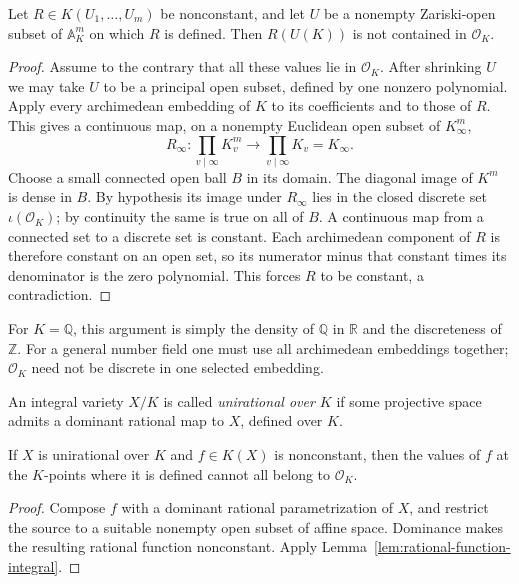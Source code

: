 \begin{lemma}\label{lem:rational-function-integral}
Let $R\in K(U_1,\ldots,U_m)$ be nonconstant, and let $U$ be a nonempty
Zariski-open subset of $\mathbb A^m_K$ on which $R$ is defined.
Then $R(U(K))$ is not contained in $\mathcal O_K$.
\end{lemma}
\begin{proof}
Assume to the contrary that all these values lie in $\mathcal O_K$.
After shrinking $U$ we may take $U$ to be a principal open subset, defined by
one nonzero polynomial.  Apply every archimedean embedding of $K$ to its
coefficients and to those of $R$.  This gives a continuous map, on a nonempty
Euclidean open subset of $K_{\infty}^{m}$,
\[
 R_{\infty}:\prod_{v\mid\infty}K_v^m
       \longrightarrow\prod_{v\mid\infty}K_v=K_{\infty}.
\]
Choose a small connected open ball $B$ in its domain.  The diagonal image of
$K^m$ is dense in $B$.  By hypothesis its image under $R_{\infty}$ lies in
the closed discrete set $\iota(\mathcal O_K)$; by continuity the same is true
on all of $B$.  A continuous map from a connected set to a discrete set is
constant.  Each archimedean component of $R$ is therefore constant on an
open set, so its numerator minus that constant times its denominator is the
zero polynomial.  This forces $R$ to be constant, a contradiction.
\end{proof}

For $K=\mathbb Q$, this argument is simply the density of $\mathbb Q$ in
$\mathbb R$ and the discreteness of $\mathbb Z$.  For a general number field
one must use all archimedean embeddings together; $\mathcal O_K$ need not be
discrete in one selected embedding.

An integral variety $X/K$ is called \emph{unirational over $K$} if some
projective space admits a dominant rational map to $X$, defined over $K$.

\begin{corollary}\label{cor:unirational-integral}
If $X$ is unirational over $K$ and $f\in K(X)$ is nonconstant, then the values
of $f$ at the $K$-points where it is defined cannot all belong to
$\mathcal O_K$.
\end{corollary}
\begin{proof}
Compose $f$ with a dominant rational parametrization of $X$, and restrict
the source to a suitable nonempty open subset of affine space.  Dominance
makes the resulting rational function nonconstant.  Apply
Lemma~\ref{lem:rational-function-integral}.
\end{proof}

